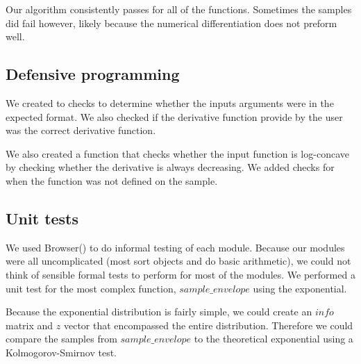 \documentclass{article}\usepackage[]{graphicx}\usepackage[]{color}
\begin{document}
Our algorithm consistently passes for all of the functions. Sometimes
the samples did fail however, likely because the numerical
differentiation does not preform well.

\subsection{Defensive programming}

We created to checks to determine whether the inputs arguments were in
the expected format. We also checked if the derivative function provide
by the user was the correct derivative function. 

We also created a function that checks whether the input function is
log-concave by checking whether the derivative is always
decreasing. We added checks for when the function was not defined
on the sample.

\subsection{Unit tests}

We used Browser() to do informal testing of each module. Because our
modules were all uncomplicated (most sort objects and do basic
arithmetic), we could not think of sensible formal tests to
perform for most of the modules. We performed a unit test for the most
complex function, $sample\_envelope$ using the exponential.

Because the exponential distribution is fairly simple, we could create
an $info$ matrix and $z$ vector that encompassed the entire
distribution. Therefore we could compare the samples from
$sample\_envelope$ to the theoretical exponential using a
Kolmogorov-Smirnov test. 
\end{document}
